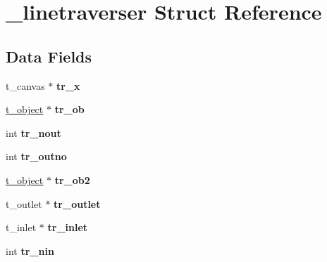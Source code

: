 \hypertarget{struct__linetraverser}{\section{\-\_\-linetraverser Struct Reference}
\label{struct__linetraverser}
}
\subsection*{Data Fields}
\begin{DoxyCompactItemize}
\item 
\hypertarget{struct__linetraverser_ad39c9a9d997342cf9fed65d8cba8343e}{t\-\_\-canvas $\ast$ {\bfseries tr\-\_\-x}}\label{struct__linetraverser_ad39c9a9d997342cf9fed65d8cba8343e}

\item 
\hypertarget{struct__linetraverser_adf952ddaf411380804510b0d45a195e1}{\hyperlink{struct__text}{t\-\_\-object} $\ast$ {\bfseries tr\-\_\-ob}}\label{struct__linetraverser_adf952ddaf411380804510b0d45a195e1}

\item 
\hypertarget{struct__linetraverser_a6f203653280ae83a8c951dc446fc0c43}{int {\bfseries tr\-\_\-nout}}\label{struct__linetraverser_a6f203653280ae83a8c951dc446fc0c43}

\item 
\hypertarget{struct__linetraverser_a252de2fd60ee37cbf4dae599cda9e0bd}{int {\bfseries tr\-\_\-outno}}\label{struct__linetraverser_a252de2fd60ee37cbf4dae599cda9e0bd}

\item 
\hypertarget{struct__linetraverser_a327e8034e3aa2f78469cfa590aa927dc}{\hyperlink{struct__text}{t\-\_\-object} $\ast$ {\bfseries tr\-\_\-ob2}}\label{struct__linetraverser_a327e8034e3aa2f78469cfa590aa927dc}

\item 
\hypertarget{struct__linetraverser_a1cc16318a7e99ed543dfd52cddf27321}{t\-\_\-outlet $\ast$ {\bfseries tr\-\_\-outlet}}\label{struct__linetraverser_a1cc16318a7e99ed543dfd52cddf27321}

\item 
\hypertarget{struct__linetraverser_a4fa9a07ae8382f5970921b93766a4fc7}{t\-\_\-inlet $\ast$ {\bfseries tr\-\_\-inlet}}\label{struct__linetraverser_a4fa9a07ae8382f5970921b93766a4fc7}

\item 
\hypertarget{struct__linetraverser_a25b81d3e4568e6879ea770124b09d1f7}{int {\bfseries tr\-\_\-nin}}\label{struct__linetraverser_a25b81d3e4568e6879ea770124b09d1f7}


\end{DoxyCompactItemize}
